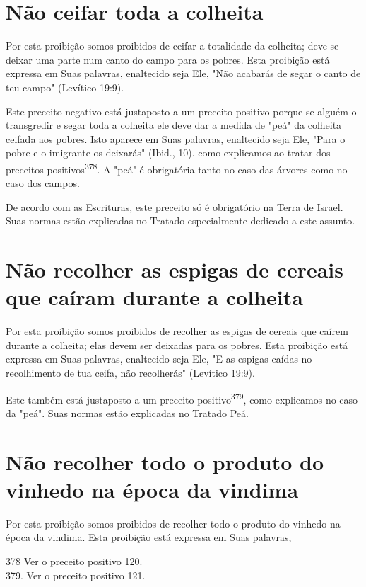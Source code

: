 \begin{itemize}
\begin{enumrate}
\begin{itemize}
\begin{itemize}
\begin{itemize}
\section{Não ceifar toda a colheita}

Por esta proibição somos proibidos de ceifar a totalidade da colhei­ta;
deve-se deixar uma parte num canto do campo para os pobres. Esta
proibi­ção está expressa em Suas palavras, enaltecido seja Ele, "Não
acabarás de segar o canto de teu campo" (Levítico 19:9).

Este preceito negativo está justaposto a um preceito positivo por­que se
alguém o transgredir e segar toda a colheita ele deve dar a medida de
"peá" da colheita ceifada aos pobres. Isto aparece em Suas palavras,
enaltecido seja Ele, "Para o pobre e o imigrante os deixarás" (Ibid.,
10). como explicamos ao tratar dos preceitos
positivos\textsuperscript{378}. A "peá" é obrigatória tanto no caso das
árvores como no caso dos campos.

De acordo com as Escrituras, este preceito só é obrigatório na Terra de
Israel. Suas normas estão explicadas no Tratado especialmente dedicado a
este assunto.

\section{Não recolher as espigas de cereais que caíram durante a colheita}

Por esta proibição somos proibidos de recolher as espigas de cereais que
caírem durante a colheita; elas devem ser deixadas para os pobres. Esta
proi­bição está expressa em Suas palavras, enaltecido seja Ele, "E as
espigas caídas no recolhimento de tua ceifa, não recolherás" (Levítico
19:9).

Este também está justaposto a um preceito positivo\textsuperscript{379},
como expli­camos no caso da "peá". Suas normas estão explicadas no
Tratado Peá.

\section{Não recolher todo o produto do vinhedo na época da vindima}

Por esta proibição somos proibidos de recolher todo o produto do vinhedo
na época da vindima. Esta proibição está expressa em Suas palavras,


378 Ver o preceito positivo 120.\\
379. Ver o preceito positivo 121.




\end{itemize}
\end{itemize}
\end{itemize}
\end{enumrate}
\end{itemize}
